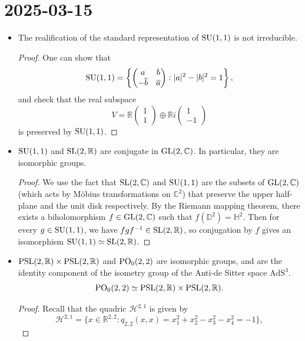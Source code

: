 \documentclass{report}
\begin{document}
\section{2025-03-15}
\begin{itemize}
    \item The realification of the standard representation of $\operatorname{{\mathrm{SU}}}(1,1)$ is not irreducible.
    \begin{proof}
        One can show that
        \[
        \operatorname{{\mathrm{SU}}}(1,1) = \left\{ \begin{pmatrix}
            a & b \\
            -\overline b & \overline a 
        \end{pmatrix}: |a|^2 - |b|^2 = 1 \right\},
        \]
        and check that the real subspace
        \[
        V = \mathbb R \begin{pmatrix} 1 \\ 1 \end{pmatrix} \oplus
        \mathbb R i \begin{pmatrix} 1 \\ -1 \end{pmatrix}
        \]
        is preserved by $\operatorname{{\mathrm{SU}}}(1,1)$.
    \end{proof}
    \item $\operatorname{{\mathrm{SU}}}(1,1)$ and $\operatorname{{\mathrm{SL}}}(2, \mathbb R)$ are conjugate in $\operatorname{{\mathrm{GL}}}(2, \mathbb C)$.
    In particular, they are isomorphic groups.
    \begin{proof}
        We use the fact that $\operatorname{{\mathrm{SL}}}(2,\mathbb C)$ and $\operatorname{{\mathrm{SU}}}(1,1)$ are the subsets of $\operatorname{{\mathrm{GL}}}(2, \mathbb C)$ (which acts by Möbius transformations on $\mathbb C^2$) that preserve the upper half-plane and the unit disk respectively.
        By the Riemann mapping theorem, there exists a biholomorphism $f\in \operatorname{{\mathrm{GL}}}(2,\mathbb C)$ such that $f(\mathbb D^2) = \mathbb H^2$.
        Then for every $g \in \operatorname{{\mathrm{SU}}}(1,1)$, we have $f g f^{-1} \in \operatorname{{\mathrm{SL}}}(2, \mathbb R)$, so conjugation by $f$ gives an isomorphism $\operatorname{{\mathrm{SU}}}(1,1) \simeq \operatorname{{\mathrm{SL}}}(2, \mathbb R)$.
    \end{proof}
    \item $\operatorname{{\mathrm{PSL}}}(2,\mathbb R) \times \operatorname{{\mathrm{PSL}}}(2,\mathbb R)$ and $\operatorname{{\mathrm{PO}}}_0(2,2)$ are isomorphic groups, and are the identity component of the isometry group of the Anti-de Sitter space $\mathrm{AdS}^3$.
    \[
    \operatorname{{\mathrm{PO}}}_0(2,2) \simeq \operatorname{{\mathrm{PSL}}}(2,\mathbb R) \times \operatorname{{\mathrm{PSL}}}(2,\mathbb R).
    \]
    \begin{proof}
        Recall that the quadric $\mathcal H^{2,1}$ is given by
        \[
        \mathcal H^{2,1} = \{ x \in \mathbb R^{2,2} : q_{2,2}(x,x) = x_1^2 + x_2^2 -  x_3^2 - x_4^2 = -1\},
\]
\end{proof}
\end{itemize}
\end{document}
